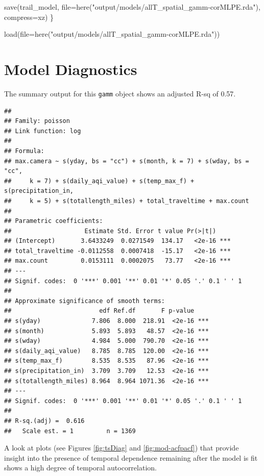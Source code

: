 \documentclass[
]{book}
\newenvironment{Shaded}{\begin{snugshade}}{\end{snugshade}}
\newcommand{\AttributeTok}[1]{\textcolor[rgb]{0.77,0.63,0.00}{#1}}
\newcommand{\FunctionTok}[1]{\textcolor[rgb]{0.00,0.00,0.00}{#1}}
\newcommand{\NormalTok}[1]{#1}
\newcommand{\StringTok}[1]{\textcolor[rgb]{0.31,0.60,0.02}{#1}}
\begin{document}
\begin{Shaded}
\begin{Highlighting}[]
\FunctionTok{save}\NormalTok{(trail\_model, }
     \AttributeTok{file=}\FunctionTok{here}\NormalTok{(}\StringTok{"output/models/allT\_spatial\_gamm{-}corMLPE.rda"}\NormalTok{), }
     \AttributeTok{compress=}\StringTok{\textquotesingle{}xz\textquotesingle{}}\NormalTok{)}
\NormalTok{\}}

\FunctionTok{load}\NormalTok{(}\AttributeTok{file=}\FunctionTok{here}\NormalTok{(}\StringTok{"output/models/allT\_spatial\_gamm{-}corMLPE.rda"}\NormalTok{))}
\end{Highlighting}
\end{Shaded}

\hypertarget{model-diagnostics}{%
\section{Model Diagnostics}\label{model-diagnostics}}

The summary output for this \texttt{gamm} object shows an adjusted R-sq of 0.57.

\begin{verbatim}
## 
## Family: poisson 
## Link function: log 
## 
## Formula:
## max.camera ~ s(yday, bs = "cc") + s(month, k = 7) + s(wday, bs = "cc", 
##     k = 7) + s(daily_aqi_value) + s(temp_max_f) + s(precipitation_in, 
##     k = 5) + s(totallength_miles) + total_traveltime + max.count
## 
## Parametric coefficients:
##                    Estimate Std. Error t value Pr(>|t|)    
## (Intercept)       3.6433249  0.0271549  134.17   <2e-16 ***
## total_traveltime -0.0112558  0.0007418  -15.17   <2e-16 ***
## max.count         0.0153111  0.0002075   73.77   <2e-16 ***
## ---
## Signif. codes:  0 '***' 0.001 '**' 0.01 '*' 0.05 '.' 0.1 ' ' 1
## 
## Approximate significance of smooth terms:
##                        edf Ref.df       F p-value    
## s(yday)              7.806  8.000  218.91  <2e-16 ***
## s(month)             5.893  5.893   48.57  <2e-16 ***
## s(wday)              4.984  5.000  790.70  <2e-16 ***
## s(daily_aqi_value)   8.785  8.785  120.00  <2e-16 ***
## s(temp_max_f)        8.535  8.535   87.96  <2e-16 ***
## s(precipitation_in)  3.709  3.709   12.53  <2e-16 ***
## s(totallength_miles) 8.964  8.964 1071.36  <2e-16 ***
## ---
## Signif. codes:  0 '***' 0.001 '**' 0.01 '*' 0.05 '.' 0.1 ' ' 1
## 
## R-sq.(adj) =  0.616   
##   Scale est. = 1         n = 1369
\end{verbatim}

A look at plots (see Figures \ref{fig:tsDiag} and \ref{fig:mod-acfpacf}) that provide insight into the presence of temporal dependence remaining after the model is fit shows a high degree of temporal autocorrelation.
\end{document}

